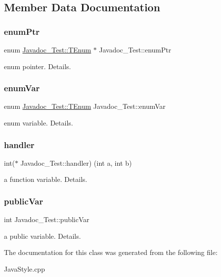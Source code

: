 \subsection{Member Data Documentation}
\mbox{\label{class_javadoc___test_abcb36df9d8af3e69290c239ba483d6df}} 
\subsubsection{\texorpdfstring{enum\+Ptr}{enumPtr}}
{\footnotesize\ttfamily enum \mbox{\hyperlink{class_javadoc___test_ae37fd1cbf1af522674cbd33873b786a6}{Javadoc\+\_\+\+Test\+::\+T\+Enum}} 
       $\ast$ Javadoc\+\_\+\+Test\+::enum\+Ptr}

enum pointer. Details. \mbox{\label{class_javadoc___test_a689558649150237b53a5c8ed89c996c2}} 
\subsubsection{\texorpdfstring{enum\+Var}{enumVar}}
{\footnotesize\ttfamily enum \mbox{\hyperlink{class_javadoc___test_ae37fd1cbf1af522674cbd33873b786a6}{Javadoc\+\_\+\+Test\+::\+T\+Enum}}
        Javadoc\+\_\+\+Test\+::enum\+Var}

enum variable. Details. \mbox{\label{class_javadoc___test_ace81a523a4eef44501a841a6d338832b}} 
\subsubsection{\texorpdfstring{handler}{handler}}
{\footnotesize\ttfamily int($\ast$ Javadoc\+\_\+\+Test\+::handler) (int a, int b)}

a function variable. Details. \mbox{\label{class_javadoc___test_a44a516fbc3a4865e2dcae34649c9df6a}} 
\subsubsection{\texorpdfstring{public\+Var}{publicVar}}
{\footnotesize\ttfamily int Javadoc\+\_\+\+Test\+::public\+Var}

a public variable. Details. 

The documentation for this class was generated from the following file\+:\begin{DoxyCompactItemize}
\item 
Java\+Style.\+cpp\end{DoxyCompactItemize}
